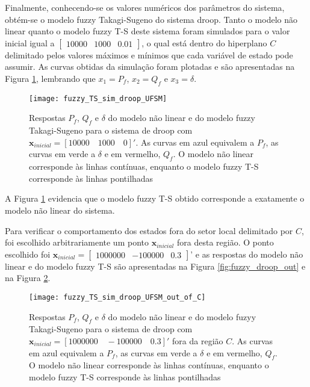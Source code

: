 Finalmente, conhecendo-se os valores numéricos dos parâmetros do sistema, obtém-se o modelo fuzzy Takagi-Sugeno do sistema droop. Tanto o modelo não linear quanto o modelo fuzzy T-S deste sistema foram simulados para o valor inicial igual a $\begin{bmatrix}10000&1000&0.01\end{bmatrix}$, o qual está dentro do hiperplano $C$ delimitado pelos valores máximos e mínimos que cada variável de estado pode assumir. As curvas obtidas da simulação foram plotadas e são apresentadas na Figura \ref{fig:sim_fuzyy_TS_droop_UFSM}, lembrando que $x_1 = P_f$, $x_2 = Q_f$ e $x_3 = \delta$.

\begin{figure}[htbp]
	\centering
	\texttt{[image: fuzzy\_TS\_sim\_droop\_UFSM]}
	\caption{Respostas $P_f$, $Q_f$ e $\delta$ do modelo não linear e do modelo fuzzy Takagi-Sugeno para o sistema de droop com $\textbf{x}_{inicial} = [10000\quad1000\quad0]'$. As curvas em azul equivalem a $P_f$, as curvas em verde a $\delta$ e em vermelho, $Q_f$. O modelo não linear corresponde às linhas contínuas, enquanto o modelo fuzzy T-S corresponde às linhas pontilhadas}\label{fig:sim_fuzyy_TS_droop_UFSM}
\end{figure}

A Figura \ref{fig:sim_fuzyy_TS_droop_UFSM} evidencia que o modelo fuzzy T-S obtido corresponde a exatamente o modelo não linear do sistema.

Para verificar o comportamento dos estados fora do setor local delimitado por $C$, foi escolhido arbitrariamente um ponto $\textbf{x}_{inicial}$ fora desta região. O ponto escolhido foi $\textbf{x}_{inicial} = \begin{bmatrix}1000000&-100000&0.3\end{bmatrix}$' e as respostas do modelo não linear e do modelo fuzzy T-S são apresentadas na Figura \ref{fig:fuzzy_droop_out} e na Figura \ref{fig:sim_fuzzy_TS_droop_UFSM_out_of_C}.

\begin{figure}[htbp]
	\centering
	\texttt{[image: fuzzy\_TS\_sim\_droop\_UFSM\_out\_of\_C]}
	\caption{Respostas $P_f$, $Q_f$ e $\delta$ do modelo não linear e do modelo fuzyy Takagi-Sugeno para o sistema de droop com $\textbf{x}_{inicial} = [1000000\quad-100000\quad0.3]'$ fora da região $C$. As curvas em azul equivalem a $P_f$, as curvas em verde a $\delta$ e em vermelho, $Q_f$. O modelo não linear corresponde às linhas contínuas, enquanto o modelo fuzzy T-S corresponde às linhas pontilhadas}\label{fig:sim_fuzzy_TS_droop_UFSM_out_of_C}
\end{figure}

